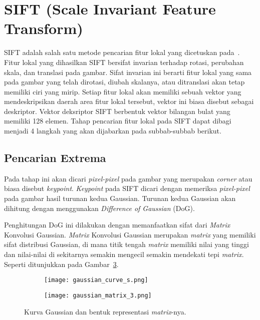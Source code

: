 \section{SIFT (Scale Invariant Feature Transform)}
\label{sec:sift}
SIFT adalah salah satu metode pencarian fitur lokal yang dicetuskan pada~\cite{lowe2004sift}. Fitur lokal yang dihasilkan SIFT bersifat invarian terhadap rotasi, perubahan skala, dan translasi pada gambar. Sifat invarian ini berarti fitur lokal yang sama pada gambar yang telah dirotasi, diubah skalanya, atau ditranslasi akan tetap memiliki ciri yang mirip. Setiap fitur lokal akan memiliki sebuah vektor yang mendeskripsikan daerah area fitur lokal tersebut, vektor ini biasa disebut sebagai deskriptor. Vektor deksriptor SIFT berbentuk vektor bilangan bulat yang memiliki 128 elemen. Tahap pencarian fitur lokal pada SIFT dapat dibagi menjadi 4 langkah yang akan dijabarkan pada subbab-subbab berikut.

\subsection{Pencarian Extrema}
Pada tahap ini akan dicari \textit{pixel-pixel} pada gambar yang merupakan \textit{corner} atau biasa disebut \textit{keypoint}. \textit{Keypoint} pada SIFT dicari dengan memeriksa \textit{pixel-pixel} pada gambar hasil turunan kedua Gaussian. Turunan kedua Gaussian akan dihitung dengan menggunakan \textit{Difference of Gaussian} (DoG).

Penghitungan DoG ini dilakukan dengan memanfaatkan sifat dari \textit{Matrix} Konvolusi Gaussian. \textit{Matrix} Konvolusi Gaussian merupakan \textit{matrix} yang memiliki sifat distribusi Gaussian, di mana titik tengah \textit{matrix} memiliki nilai yang tinggi dan nilai-nilai di sekitarnya semakin mengecil semakin mendekati tepi \textit{matrix}. Seperti ditunjukkan pada Gambar~\ref{fig:gaussian_function}. 

\begin{figure}[H]
	\begin{subfigure}[b]{.5\textwidth}
		\centering
		\texttt{[image: gaussian\_curve\_s.png]}
		\caption{}
		\label{subfig:gaussian_curve}
	\end{subfigure}%
	\begin{subfigure}[b]{.5\textwidth}
		\centering
		\texttt{[image: gaussian\_matrix\_3.png]}
		\caption{}
		\label{subfig:gaussian_matrix}
	\end{subfigure}
	\caption{Kurva Gaussian dan bentuk representasi \textit{matrix}-nya.}
	\label{fig:gaussian_function}
\end{figure}

